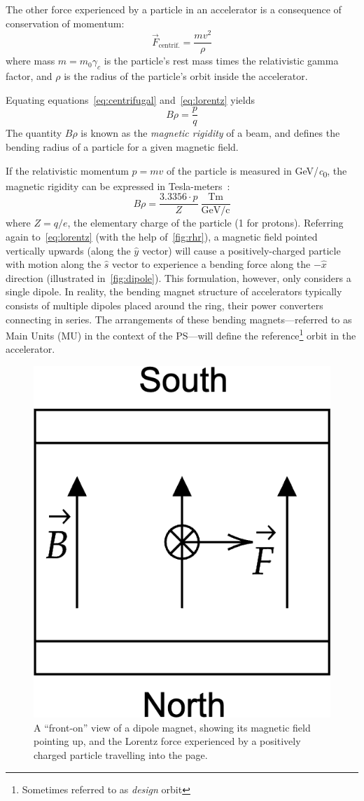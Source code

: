 \documentclass[a4paper,twoside,11pt]{report}
\begin{document}
The other force experienced by a particle in an accelerator is a consequence of conservation of momentum:
\begin{equation}
\vec F_{\text{centrif.}}=\frac{mv^2}{\rho}\label{eq:centrifugal}
\end{equation} where mass $m = m_0\gamma_c$ is the particle's rest mass times the relativistic gamma factor, and $\rho$ is the radius of the particle's orbit inside the accelerator.

Equating equations~\ref{eq:centrifugal} and~\ref{eq:lorentz} yields
\begin{equation}
B\rho=\frac pq
\label{eq:brho}
\end{equation}
The quantity $B\rho$ is known as the \textit{magnetic rigidity} of a beam, and defines the bending radius of a particle for a given magnetic field. 

If the relativistic momentum $p=mv$ of the particle is measured in \unit[per-mode = symbol]{\GeV\per\clight}, the magnetic rigidity can be expressed in Tesla-meters~\cite[Eq 4.25]{Wiedemann}:
\begin{equation}
B\rho = \frac{3.3356\cdot p}Z\ \frac{\text{Tm}}{\text{GeV/c}}
\label{tesla-meters}
\end{equation} where $Z=q/e$, the elementary charge of the particle (1 for protons).
Referring again to~\autoref{eq:lorentz} (with the help of~\autoref{fig:rhr}), a magnetic field pointed vertically upwards (along the $\hat y$ vector) will cause a positively-charged particle with motion along the $\hat s$ vector to experience a bending force along the $-\hat x$ direction (illustrated in~\autoref{fig:dipole}). This formulation, however, only considers a single dipole. In reality, the bending magnet structure of accelerators typically consists of multiple dipoles placed around the ring, their power converters connecting in series. The arrangements of these bending magnets---referred to as Main Units (MU) in the context of the PS---will define the reference\footnote{Sometimes referred to as \textit{design} orbit} orbit in the accelerator.

\begin{figure}[h]
  \centering
  \includegraphics*[width=0.2\linewidth]{dipole-bending.png}
  \caption[Illustration of the force experienced by a charged particle in a magnetic dipole field.]{A ``front-on'' view of a dipole magnet, showing its magnetic field pointing up, and the Lorentz force experienced by a positively charged particle travelling into the page.}\label{fig:dipole}
\end{figure}
\end{document}
